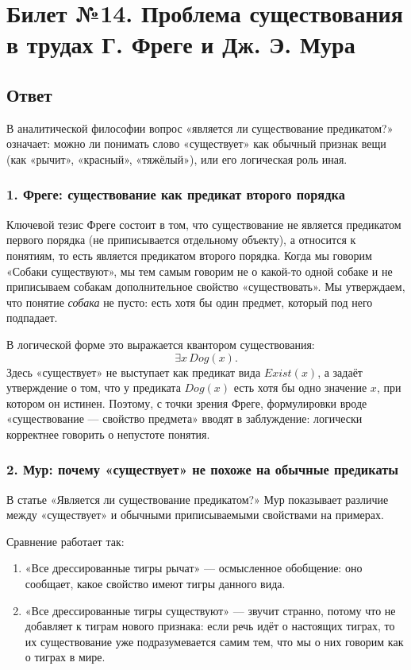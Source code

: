 \documentclass[a4paper,12pt]{article}
\begin{document}
\newpage
\section{Билет №14. Проблема существования в трудах Г. Фреге и Дж. Э. Мура}

\subsection{Ответ}

В аналитической философии вопрос «является ли существование предикатом?» означает: можно ли понимать слово «существует» как обычный признак вещи (как «рычит», «красный», «тяжёлый»), или его логическая роль иная.

\subsubsection*{1. Фреге: существование как предикат второго порядка}

Ключевой тезис Фреге состоит в том, что существование не является предикатом первого порядка (не приписывается отдельному объекту), а относится к понятиям, то есть является предикатом второго порядка. Когда мы говорим «Собаки существуют», мы тем самым говорим не о какой-то одной собаке и не приписываем собакам дополнительное свойство «существовать». Мы утверждаем, что понятие \emph{собака} не пусто: есть хотя бы один предмет, который под него подпадает.

В логической форме это выражается квантором существования:
$$\exists x\, Dog(x).$$
Здесь «существует» не выступает как предикат вида $Exist(x)$, а задаёт утверждение о том, что у предиката $Dog(x)$ есть хотя бы одно значение $x$, при котором он истинен. Поэтому, с точки зрения Фреге, формулировки вроде «существование — свойство предмета» вводят в заблуждение: логически корректнее говорить о непустоте понятия.

\subsubsection*{2. Мур: почему «существует» не похоже на обычные предикаты}

В статье «Является ли существование предикатом?» Мур показывает различие между «существует» и обычными приписываемыми свойствами на примерах.

Сравнение работает так:
\begin{enumerate}
    \item «Все дрессированные тигры рычат» — осмысленное обобщение: оно сообщает, какое свойство имеют тигры данного вида.
    \item «Все дрессированные тигры существуют» — звучит странно, потому что не добавляет к тиграм нового признака: если речь идёт о настоящих тиграх, то их существование уже подразумевается самим тем, что мы о них говорим как о тиграх в мире.
\end{enumerate}
\end{document}

